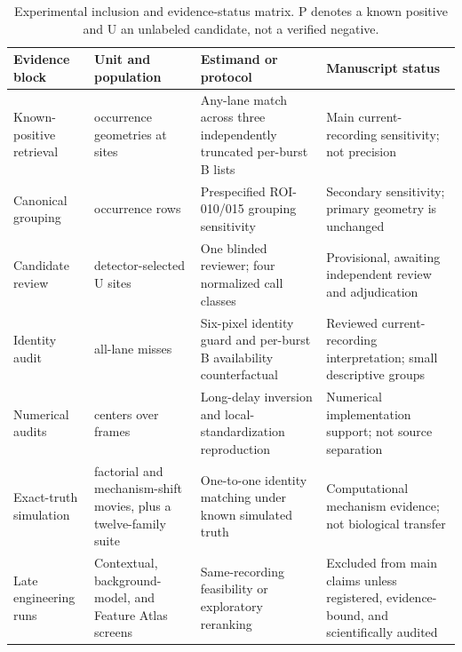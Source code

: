 \begin{table}[!htbp]
\centering
\caption{Experimental inclusion and evidence-status matrix. P denotes a known
positive and U an unlabeled candidate, not a verified negative.}
\label{tab:venue-evidence-map}
\footnotesize
\renewcommand{\arraystretch}{0.96}
\begin{tabularx}{\textwidth}{>{\raggedright\arraybackslash}p{}
  >{\raggedright\arraybackslash}p{}
  >{\raggedright\arraybackslash}p{}
  >{\raggedright\arraybackslash}X}
\toprule
Evidence block & Unit and population & Estimand or protocol & Manuscript status \\
\midrule
Known-positive retrieval & \VenueCohortOccurrences{} occurrence geometries at
\VenueCohortSites{} sites & Any-lane match across three independently truncated
per-burst B\VenuePerLaneBudget{} lists & Main current-recording sensitivity;
not precision \\
Canonical grouping & \VenueCanonicalOccurrences{} occurrence rows & Prespecified
ROI-010/015 grouping sensitivity & Secondary sensitivity; primary geometry is
unchanged \\
Candidate review & \VenueReviewedCandidates{} detector-selected U sites & One
blinded reviewer; four normalized call classes & Provisional,
awaiting independent review and adjudication \\
Identity audit & \VenueStrictMissed{} all-lane misses & Six-pixel identity guard
and per-burst B\VenueCounterfactualBudget{} availability counterfactual &
Reviewed current-recording interpretation; small descriptive groups \\
Numerical audits & \VenueCohortSites{} centers over
\VenueAuditFrames{} frames & Long-delay inversion and local-standardization
reproduction & Numerical implementation support; not source separation \\
Exact-truth simulation & \VenueMovieBenchmarkCount{} factorial and
\VenueFamilyHoldoutCount{} mechanism-shift movies, plus a twelve-family suite &
One-to-one identity matching under known simulated truth & Computational
mechanism evidence; not biological transfer \\
Late engineering runs & Contextual, background-model, and Feature Atlas screens
& Same-recording feasibility or exploratory reranking & Excluded from main
claims unless registered, evidence-bound, and scientifically audited \\
\bottomrule
\end{tabularx}
\end{table}

